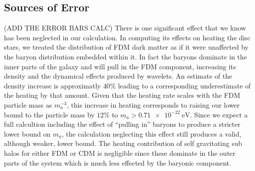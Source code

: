 \documentclass[usenatbib]{mnras}
\begin{document}
\subsection{Sources of Error}
(ADD THE ERROR BARS CALC)
{ \color{magenta} 
There is one significant effect that we know has been neglected in our calculation. In computing its effects on heating the disc stars, we treated the distribution of FDM  dark matter as if it were unaffected by the baryon distribution embedded within it. In fact the baryons
dominate in the inner parts of the galaxy and will pull in the FDM component, increasing its density and the dynamical effects produced by wavelets. An estimate of the density increase \citep{mass_profile_milky_way} is approximatly $40 \%$ leading to a corresponding underestimate of the heating by that amount. Given that the heating rate scales with the FDM particle mass as $m_a^{-3}$, this increase in heating corresponds to raising our lower bound to the particle mass by $12 \%$ to $m_a > \SI{0.71 e-22}{\electronvolt}$. Since we expect a full calcultion including the effect of ``pulling in'' baryons to produce a stricter lower bound on $m_a$, the calculation neglecting this effect still produces a valid, although weaker, lower bound. 
The heating contribution of self gravitating sub halos for either FDM or CDM is negligible since these dominate in the outer parts of the system which is much less effected by the baryonic component.  }
\end{document}
